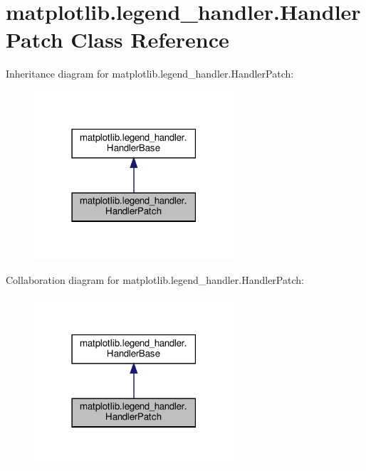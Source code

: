 \hypertarget{classmatplotlib_1_1legend__handler_1_1HandlerPatch}{}\section{matplotlib.\+legend\+\_\+handler.\+Handler\+Patch Class Reference}
\label{classmatplotlib_1_1legend__handler_1_1HandlerPatch}


Inheritance diagram for matplotlib.\+legend\+\_\+handler.\+Handler\+Patch\+:
\nopagebreak
\begin{figure}[H]
\begin{center}
\leavevmode
\includegraphics[width=210pt]{classmatplotlib_1_1legend__handler_1_1HandlerPatch__inherit__graph}
\end{center}
\end{figure}


Collaboration diagram for matplotlib.\+legend\+\_\+handler.\+Handler\+Patch\+:
\nopagebreak
\begin{figure}[H]
\begin{center}
\leavevmode
\includegraphics[width=210pt]{classmatplotlib_1_1legend__handler_1_1HandlerPatch__coll__graph}
\end{center}
\end{figure}
